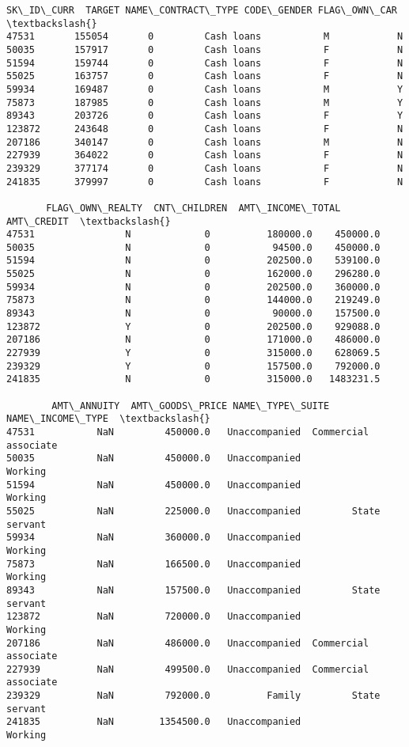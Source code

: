 \documentclass[11pt]{article}
\makeatletter
\newcommand{\boxspacing}{\kern\kvtcb@left@rule\kern\kvtcb@boxsep}
\newcommand{\prompt}[4]{
        {\ttfamily\llap{{\color{#2}[#3]:\hspace{3pt}#4}}\vspace{-\baselineskip}}
    }
\makeatother
\begin{document}
            \begin{tcolorbox}[breakable, size=fbox, boxrule=.5pt, pad at break*=1mm, opacityfill=0]
\prompt{Out}{outcolor}{22}{\boxspacing}
\begin{Verbatim}[commandchars=\\\{\}]
        SK\_ID\_CURR  TARGET NAME\_CONTRACT\_TYPE CODE\_GENDER FLAG\_OWN\_CAR  \textbackslash{}
47531       155054       0         Cash loans           M            N
50035       157917       0         Cash loans           F            N
51594       159744       0         Cash loans           F            N
55025       163757       0         Cash loans           F            N
59934       169487       0         Cash loans           M            Y
75873       187985       0         Cash loans           M            Y
89343       203726       0         Cash loans           F            Y
123872      243648       0         Cash loans           F            N
207186      340147       0         Cash loans           M            N
227939      364022       0         Cash loans           F            N
239329      377174       0         Cash loans           F            N
241835      379997       0         Cash loans           F            N

       FLAG\_OWN\_REALTY  CNT\_CHILDREN  AMT\_INCOME\_TOTAL  AMT\_CREDIT  \textbackslash{}
47531                N             0          180000.0    450000.0
50035                N             0           94500.0    450000.0
51594                N             0          202500.0    539100.0
55025                N             0          162000.0    296280.0
59934                N             0          202500.0    360000.0
75873                N             0          144000.0    219249.0
89343                N             0           90000.0    157500.0
123872               Y             0          202500.0    929088.0
207186               N             0          171000.0    486000.0
227939               Y             0          315000.0    628069.5
239329               Y             0          157500.0    792000.0
241835               N             0          315000.0   1483231.5

        AMT\_ANNUITY  AMT\_GOODS\_PRICE NAME\_TYPE\_SUITE      NAME\_INCOME\_TYPE  \textbackslash{}
47531           NaN         450000.0   Unaccompanied  Commercial associate
50035           NaN         450000.0   Unaccompanied               Working
51594           NaN         450000.0   Unaccompanied               Working
55025           NaN         225000.0   Unaccompanied         State servant
59934           NaN         360000.0   Unaccompanied               Working
75873           NaN         166500.0   Unaccompanied               Working
89343           NaN         157500.0   Unaccompanied         State servant
123872          NaN         720000.0   Unaccompanied               Working
207186          NaN         486000.0   Unaccompanied  Commercial associate
227939          NaN         499500.0   Unaccompanied  Commercial associate
239329          NaN         792000.0          Family         State servant
241835          NaN        1354500.0   Unaccompanied               Working


\end{Verbatim}
\end{tcolorbox}
\end{document}
